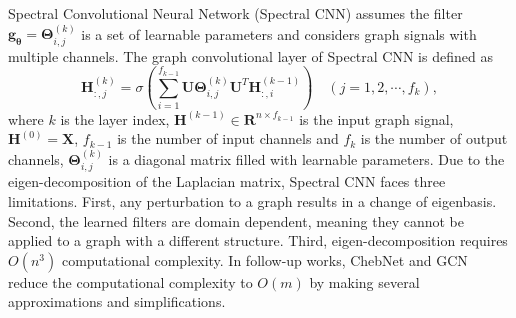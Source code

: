 	Spectral Convolutional Neural Network (Spectral CNN) \cite{bruna2013spectral} assumes the filter $\mathbf{g_\theta}=\mathbf{\Theta}_{i,j}^{(k)}$ is a set of learnable parameters and considers graph signals with multiple channels. The graph convolutional layer of Spectral CNN is defined as 
	\begin{equation}
	\label{eq:3}
	\mathbf{H}_{:,j}^{(k)} = \sigma(\sum_{i=1}^{f_{k-1}}\mathbf{U}\mathbf{\Theta}_{i,j}^{(k)}\mathbf{U}^T\mathbf{H}_{:,i}^{(k-1)}) \quad(j=1,2,\cdots, f_k),
	\end{equation}
	where $k$ is the layer index, $\mathbf{H}^{(k-1)} \in \mathbf{R}^{n\times f_{k-1}}$ is the input graph signal, $\mathbf{H}^{(0)}=\mathbf{X}$, $f_{k-1}$ is the number of input channels and $f_k$ is the number of  output channels, $\mathbf{\Theta}_{i,j}^{(k)}$ is a diagonal matrix filled with learnable parameters.  Due to the eigen-decomposition of the Laplacian matrix, Spectral CNN faces three limitations. First, any perturbation to a graph results in a change of eigenbasis. Second, the learned filters are domain dependent, meaning they cannot be applied to a graph with a different structure. Third, eigen-decomposition requires $O(n^3)$ computational complexity.  In follow-up works, ChebNet \cite{defferrard2016convolutional} and GCN \cite{kipf2017semi} reduce the computational complexity to $O(m)$ by making several approximations and simplifications. 
	
